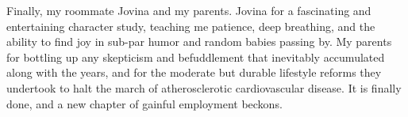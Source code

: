 
Finally, my roommate Jovina and my parents.
Jovina for a fascinating and entertaining character study, teaching
me patience, deep breathing, and the ability to find joy in sub-par humor and random babies passing
by.
My parents for bottling up any skepticism and befuddlement that inevitably accumulated along with
the years,
and for the moderate but durable lifestyle reforms they undertook to halt the march of
atherosclerotic cardiovascular
disease.
It is finally done, and a new chapter of gainful employment beckons.


